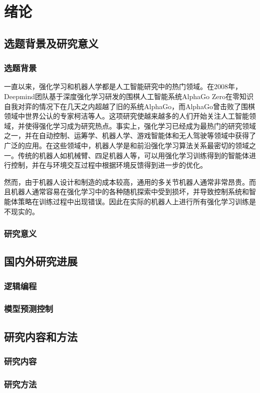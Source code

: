 \chapter{绪论}

    \section{选题背景及研究意义}
    
        \subsection{选题背景}
        一直以来，强化学习和机器人学都是人工智能研究中的热门领域。在2008年，Deepmind团队基于深度强化学习研发的围棋人工智能系统AlphaGo Zero在零知识自我对弈的情况下在几天之内超越了旧的系统AlphaGo，而AlphaGo曾击败了围棋领域中世界公认的专家柯洁等人\cite{silver2018general}。这项研究使越来越多的人们开始关注人工智能领域，并使得强化学习成为研究热点。事实上，强化学习已经成为最热门的研究领域之一，并在自动控制、运筹学、机器人学、游戏智能体和无人驾驶等领域中获得了广泛的应用\cite{dosovitskiy2017carla}。在这些领域中，机器人学是和前沿强化学习算法关系最密切的领域之一。传统的机器人如机械臂、四足机器人等，可以用强化学习训练得到的智能体进行控制，并在与环境交互过程中根据环境反馈得到进一步的优化。

        然而，由于机器人设计和制造的成本较高，通用的多关节机器人通常非常昂贵。而且机器人通常容易在强化学习中的各种随机探索中受到损坏，并导致控制系统和智能体策略在训练过程中出现错误。因此在实际的机器人上进行所有强化学习训练是不现实的\cite{toussaint2018differentiable}。
        
        \subsection{研究意义}
    
    \section{国内外研究进展}

        \subsection{逻辑编程}

        \subsection{模型预测控制}

    \section{研究内容和方法}

        \subsection{研究内容}

        \subsection{研究方法}

